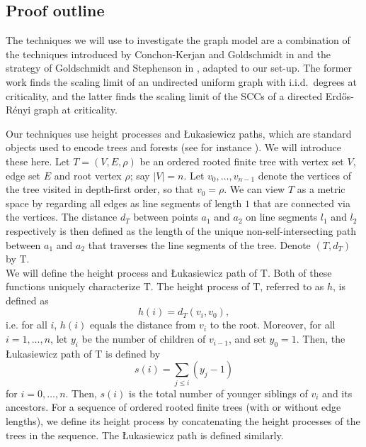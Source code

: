 \subsection{Proof outline}\label{sec:proofoutline}

\def \exploredvertices {\mathcal V}
\def \explorededges {\mathcal E}
\def \forest {F}
\def \edgestack {\mathcal Q}

The techniques we will use to investigate the graph model are a combination of the techniques introduced by Conchon-Kerjan and Goldschmidt in \cite{conchon--kerjanStableGraphMetric2020} and the strategy of Goldschmidt and Stephenson in \cite{goldschmidtScalingLimitCritical2019}, adapted to our set-up. The former work finds the scaling limit of an undirected uniform graph with i.i.d.\ degrees at criticality, and the latter finds the scaling limit of the SCCs of a directed Erd\H{o}s-Rényi graph at criticality. 

Our techniques use height processes and \L ukasiewicz paths, which are standard objects used to encode trees and forests (see for instance \cite[Chapter 0]{AST_2002__281__R1_0}). We will introduce these here. Let $T=(V,E,\rho)$ be an ordered rooted finite tree with vertex set $V$, edge set $E$ and root vertex $\rho$; say $|V|=n$. Let $v_0,\dots,v_{n-1}$ denote the vertices of the tree visited in depth-first order, so that $v_0=\rho$. We can view $T$ as a metric space by regarding all edges as line segments of length $1$ that are connected via the vertices. The distance $d_T$ between points $a_1$ and $a_2$ on line segments $l_1$ and $l_2$ respectively is then defined as the length of the unique non-self-intersecting path between $a_1$ and $a_2$ that traverses the line segments of the tree. Denote $(T,d_T)$ by $\mathrm{T}$.\\
We will define the height process and \L ukasiewicz path of $\mathrm{T}$. Both of these functions uniquely characterize $\mathrm{T}$. The height process of $\mathrm{T}$, referred to as $h$, is defined as $$h(i)=d_T(v_i,v_0),$$ i.e.  for all $i$, $h(i)$ equals the distance from $v_i$ to the root.
Moreover, for all $i=1,\dots,n$, let $y_i$ be the number of children of $v_{i-1}$, and set $y_0=1$. Then, the \L ukasiewicz path of $\mathrm{T}$ is defined by $$s(i)=\sum\limits_{j\leq i} (y_j-1)$$ for $i=0,\dots,n$. Then, $s(i)$ is the total number of younger siblings of $v_i$ and its ancestors.
For a sequence of ordered rooted finite trees (with or without edge lengths), we define its height process by concatenating the height processes of the trees in the sequence. The \L ukasiewicz path is defined similarly. 


